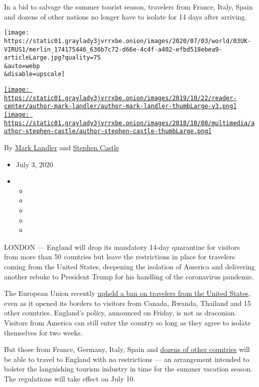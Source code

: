 In a bid to salvage the summer tourist season, travelers from France,
Italy, Spain and dozens of other nations no longer have to isolate for
14 days after arriving.

\texttt{[image: https://static01.graylady3jvrrxbe.onion/images/2020/07/03/world/03UK-VIRUS1/merlin\_174175446\_636b7c72-d66e-4c4f-a402-efbd518ebea9-articleLarge.jpg?quality=75\\\&auto=webp\\\&disable=upscale]}

\href{https://www.nytimes3xbfgragh.onion/by/mark-landler}{\texttt{[image: https://static01.graylady3jvrrxbe.onion/images/2019/10/22/reader-center/author-mark-landler/author-mark-landler-thumbLarge-v3.png]}}\href{https://www.nytimes3xbfgragh.onion/by/stephen-castle}{\texttt{[image: https://static01.graylady3jvrrxbe.onion/images/2018/10/08/multimedia/author-stephen-castle/author-stephen-castle-thumbLarge.png]}}

By \href{https://www.nytimes3xbfgragh.onion/by/mark-landler}{Mark
Landler} and
\href{https://www.nytimes3xbfgragh.onion/by/stephen-castle}{Stephen
Castle}

\begin{itemize}
\item
  July 3, 2020
\item
  \begin{itemize}
  \item
  \item
  \item
  \item
  \item
  \end{itemize}
\end{itemize}

LONDON --- England will drop its mandatory 14-day quarantine for
visitors from more than 50 countries but leave the restrictions in place
for travelers coming from the United States, deepening the isolation of
America and delivering another rebuke to President Trump for his
handling of the coronavirus pandemic.

The European Union recently
\href{https://www.nytimes3xbfgragh.onion/2020/06/30/world/europe/eu-reopening-blocks-us-travelers.html}{upheld
a ban on travelers from the United States}, even as it opened its
borders to visitors from Canada, Rwanda, Thailand and 15 other
countries. England's policy, announced on Friday, is not as draconian.
Visitors from America can still enter the country so long as they agree
to isolate themselves for two weeks.

But those from France, Germany, Italy, Spain and
\href{https://www.theguardian.com/politics/live/2020/jul/03/uk-coronavirus-live-boris-johnson-warn-public-pubs-reopen-england-saturday?page=with:block-5eff3c7b8f08ff51fe2ac38a\#block-5eff3c7b8f08ff51fe2ac38a}{dozens
of other countries} will be able to travel to England with no
restrictions --- an arrangement intended to bolster the languishing
tourism industry in time for the summer vacation season. The regulations
will take effect on July 10.

